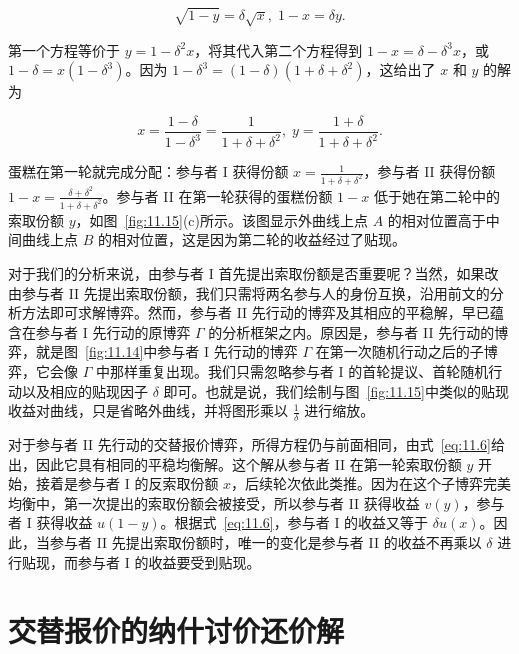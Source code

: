 \[
\sqrt{1 - y} = \delta \sqrt{x},\;1 - x = {\delta y}.
\]

第一个方程等价于 \(y = 1 - {\delta }^{2}x\)，将其代入第二个方程得到 \(1 - x = \delta  - {\delta }^{3}x\)，或 \(1 - \delta  = x\left( {1 - {\delta }^{3}}\right)\)。因为 \(1 - {\delta }^{3} = \left( {1 - \delta }\right) \left( {1 + \delta  + {\delta }^{2}}\right)\)，这给出了 \(x\) 和 \(y\) 的解为

\begin{equation}
\label{eq:11.7}
x = \frac{1 - \delta }{1 - {\delta }^{3}} = \frac{1}{1 + \delta  + {\delta }^{2}},\;y = \frac{1 + \delta }{1 + \delta  + {\delta }^{2}}.
\end{equation}

蛋糕在第一轮就完成分配：参与者 I 获得份额 \(x = \frac{1}{1 + \delta  + {\delta }^{2}}\)，参与者 II 获得份额 \(1 - x = \frac{\delta  + {\delta }^{2}}{1 + \delta  + {\delta }^{2}}\)。参与者 II 在第一轮获得的蛋糕份额 \(1 - x\) 低于她在第二轮中的索取份额 \(y\)，如图~\ref{fig:11.15}(c)所示。该图显示外曲线上点 \(A\) 的相对位置高于中间曲线上点 \(B\) 的相对位置，这是因为第二轮的收益经过了贴现。


对于我们的分析来说，由参与者 I 首先提出索取份额是否重要呢？当然，如果改由参与者 II 先提出索取份额，我们只需将两名参与人的身份互换，沿用前文的分析方法即可求解博弈。然而，参与者 II 先行动的博弈及其相应的平稳解，早已蕴含在参与者 I 先行动的原博弈 \(\Gamma\) 的分析框架之内。原因是，参与者 II 先行动的博弈，就是图~\ref{fig:11.14}中参与者 I 先行动的博弈 \(\Gamma\) 在第一次随机行动之后的子博弈，它会像 \(\Gamma\) 中那样重复出现。我们只需忽略参与者 I 的首轮提议、首轮随机行动以及相应的贴现因子 \(\delta\) 即可。也就是说，我们绘制与图~\ref{fig:11.15}中类似的贴现收益对曲线，只是省略外曲线，并将图形乘以 \(\frac{1}{\delta }\) 进行缩放。

对于参与者 II 先行动的交替报价博弈，所得方程仍与前面相同，由式~\eqref{eq:11.6}给出，因此它具有相同的平稳均衡解。这个解从参与者 II 在第一轮索取份额 \(y\) 开始，接着是参与者 I 的反索取份额 \(x\)，后续轮次依此类推。因为在这个子博弈完美均衡中，第一次提出的索取份额会被接受，所以参与者 II 获得收益 \(v\left( y\right)\)，参与者 I 获得收益 \(u\left( {1 - y}\right)\)。根据式~\eqref{eq:11.6}，参与者 I 的收益又等于 \({\delta u}\left( x\right)\)。因此，当参与者 II 先提出索取份额时，唯一的变化是参与者 II 的收益不再乘以 \(\delta\) 进行贴现，而参与者 I 的收益要受到贴现。


\section{交替报价的纳什讨价还价解}\label{sec11.11}

